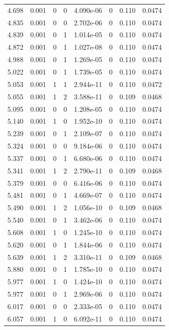 \documentclass[preview]{standalone}
\begin{document}
{{{\begin{tabular}{L{1.2cm}C{1.2cm} C{0.3cm}C{0.5cm} C{1.4cm}C{1.4cm} C{1.4cm}C{1.4cm}}
  4.698  &  0.001  & 0     &  0 &  4.090e-06  & 0  & 0.110 &  0.0474   \\ 
  4.835  &  0.001  & 0     &  0 &  2.702e-06  & 0  & 0.110 &  0.0474   \\ 
  4.839  &  0.001  & 0     &  1 &  1.014e-05  & 0  & 0.110 &  0.0474   \\ 
  4.872  &  0.001  & 0     &  1 &  1.027e-08  & 0  & 0.110 &  0.0474   \\ 
  4.988  &  0.001  & 0     &  1 &  1.269e-05  & 0  & 0.110 &  0.0474   \\ 
  5.022  &  0.001  & 0     &  1 &  1.739e-05  & 0  & 0.110 &  0.0474   \\ 
  5.053  &  0.001  & 1     &  1 &  2.944e-11  & 0  & 0.110 &  0.0472   \\ 
  5.055  &  0.001  & 1     &  2 &  3.588e-11  & 0  & 0.109 &  0.0468   \\ 
  5.095  &  0.001  & 0     &  0 &  1.208e-05  & 0  & 0.110 &  0.0474   \\ 
  5.140  &  0.001  & 1     &  0 &  1.952e-10  & 0  & 0.110 &  0.0474   \\ 
  5.239  &  0.001  & 0     &  1 &  2.109e-07  & 0  & 0.110 &  0.0474   \\ 
  5.324  &  0.001  & 0     &  0 &  9.184e-06  & 0  & 0.110 &  0.0474   \\ 
  5.337  &  0.001  & 0     &  1 &  6.680e-06  & 0  & 0.110 &  0.0474   \\ 
  5.341  &  0.001  & 1     &  2 &  2.790e-11  & 0  & 0.109 &  0.0468   \\ 
  5.379  &  0.001  & 0     &  0 &  6.416e-06  & 0  & 0.110 &  0.0474   \\ 
  5.481  &  0.001  & 0     &  1 &  4.669e-07  & 0  & 0.110 &  0.0474   \\ 
  5.490  &  0.001  & 1     &  2 &  1.056e-10  & 0  & 0.109 &  0.0468   \\ 
  5.540  &  0.001  & 0     &  1 &  3.462e-06  & 0  & 0.110 &  0.0474   \\ 
  5.608  &  0.001  & 1     &  0 &  1.245e-10  & 0  & 0.110 &  0.0474   \\ 
  5.620  &  0.001  & 0     &  1 &  1.844e-06  & 0  & 0.110 &  0.0474   \\ 
  5.639  &  0.001  & 1     &  2 &  3.310e-11  & 0  & 0.109 &  0.0468   \\ 
  5.880  &  0.001  & 0     &  1 &  1.785e-10  & 0  & 0.110 &  0.0474   \\ 
  5.977  &  0.001  & 1     &  0 &  1.424e-10  & 0  & 0.110 &  0.0474   \\ 
  5.977  &  0.001  & 0     &  1 &  2.969e-06  & 0  & 0.110 &  0.0474   \\ 
  6.017  &  0.001  & 0     &  0 &  2.333e-05  & 0  & 0.110 &  0.0474   \\ 
  6.057  &  0.001  & 1     &  0 &  6.092e-11  & 0  & 0.110 &  0.0474   \\ 
\hline 
\end{tabular} 

}}}
\end{document}
